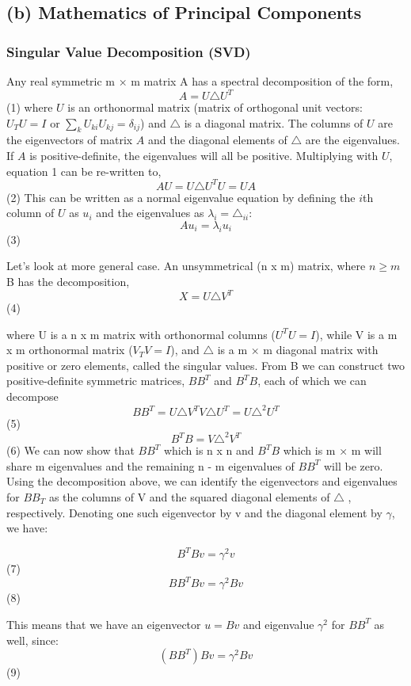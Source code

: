 \documentclass[12pt,twoside]{article}
\begin{document}
\subsection*{(b) Mathematics of Principal Components}

\subsubsection*{Singular Value Decomposition (SVD)}
\bigbreak
Any real symmetric m × m matrix A has a spectral decomposition of the form,
$$A = U\triangle U^{T}$$  \hfill(1)
\bigbreak
where $U$ is an orthonormal matrix (matrix of orthogonal unit vectors: $U_{T}U = I$ or $\sum_{k}U_{ki}U_{kj} = \delta_{ij}$) and $\triangle$ is a diagonal matrix. The columns of $U$ are the eigenvectors of matrix $A$ and the diagonal elements of $\triangle$ are the eigenvalues. If $A$ is positive-definite, the eigenvalues will all be positive. Multiplying with $U$, equation 1 can be re-written to,
$$AU = U\triangle U^{T}U = UA$$  \hfill(2)
\bigbreak
This can be written as a normal eigenvalue equation by defining the $i$th column of $U$ as
$u_{i}$ and the eigenvalues as $\lambda_{i} = \triangle_{ii}$:
$$Au_{i} = \lambda_{i}u_{i}$$  \hfill(3)

\bigbreak
Let's look at more general case. An unsymmetrical (n x m) matrix, where $n \geq m$ B has the decomposition,
$$X = U\triangle V^{T}$$  \hfill(4)

where U is a n x m matrix with orthonormal columns ($U^{T}U = I$), while V is a m x m orthonormal matrix ($V_{T}V = I$), and $\triangle$ is a m × m diagonal matrix with positive or zero elements, called the singular values.
\bigbreak
From B we can construct two positive-definite symmetric matrices, $BB^{T}$ and $B^{T}B$, each of which we can decompose
$$BB^{T} = U\triangle V^{T}V\triangle U^{T} = U\triangle^2U^{T} $$  \hfill(5)
$$B^{T}B = V\triangle^2V^{T} $$ \hfill (6)
\bigbreak
We can now show that $BB^{T}$ which is n x n and $B^{T}B$ which is m × m will share m eigenvalues and the remaining n - m eigenvalues of $BB^{T} $ will be zero.
\bigbreak
Using the decomposition above, we can identify the eigenvectors and eigenvalues for $BB_{T}$ as the columns of V and the squared diagonal elements of $\triangle$ , respectively. Denoting one such eigenvector by v and the diagonal element by $\gamma$, we have:

$$B^{T}Bv = \gamma^2v$$ \hfill (7)
$$BB^{T}Bv = \gamma^2Bv$$  \hfill (8)

\bigbreak
This means that we have an eigenvector $u = Bv$ and eigenvalue $\gamma^2$ for $BB^{T}$ as well, since:
\bigbreak
$$(BB^{T})Bv = \gamma^2Bv$$ \hfill (9)
\end{document}
